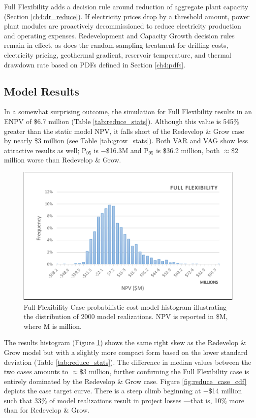 Full Flexibility adds a decision rule around reduction of aggregate plant capacity (Section \ref{ch4:dr_reduce}). If electricity prices drop by a threshold amount, power plant modules are proactively decommissioned to reduce electricity production and operating expenses. Redevelopment and Capacity Growth decision rules remain in effect, as does the random-sampling treatment for drilling costs, electricity pricing, geothermal gradient, reservoir temperature, and thermal drawdown rate based on PDFs defined in Section \ref{ch4:pdfs}.

\subsection{Model Results}\label{ch6:reduce_results}
In a somewhat surprising outcome, the simulation for Full Flexibility results in an ENPV of \$6.7 million (Table \ref{tab:reduce_stats}). Although this value is 545\% greater than the static model NPV, it falls short of the Redevelop \& Grow case by nearly \$3 million (see Table \ref{tab:grow_stats}). Both VAR and VAG show less attractive results as well; P$_{05}$ is $-\$$16.3M and P$_{95}$ is \$36.2 million, both $\approx\$2$ million worse than Redevelop \& Grow.  

\begin{figure}
\centering
\includegraphics[width=.8\textwidth]{templates/images/Figure-Reduce_Case_Histogram.png}
\caption[Full Flexibility Case histogram]{Full Flexibility Case probabilistic cost model histogram illustrating the distribution of 2000 model realizations. NPV is reported in \$M, where M is million.}
\label{fig:reduce_case_hist}
\end{figure}

The results histogram (Figure \ref{fig:reduce_case_hist}) shows the same right skew as the Redevelop \& Grow model but with a slightly more compact form based on the lower standard deviation (Table \ref{tab:reduce_stats}). The difference in median values between the two cases amounts to $\approx\$3$ million, further confirming the Full Flexibility case is entirely dominated by the Redevelop \& Grow case. Figure \ref{fig:reduce_case_cdf} depicts the case target curve. There is a steep climb beginning at $-$\$14 million such that 33\% of model realizations result in project losses ---that is, 10\% more than for Redevelop \& Grow.

